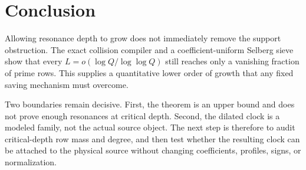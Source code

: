 \section{Conclusion}

Allowing resonance depth to grow does not immediately remove the support
obstruction.  The exact collision compiler and a coefficient-uniform Selberg
sieve show that every
\(L=o(\log Q/\log\log Q)\) still reaches only a vanishing fraction of prime
rows.  This supplies a quantitative lower order of growth that any fixed
saving mechanism must overcome.

Two boundaries remain decisive.  First, the theorem is an upper bound and
does not prove enough resonances at critical depth.  Second, the dilated clock
is a modeled family, not the actual source object.  The next step is therefore
to audit critical-depth row mass and degree, and then test whether the
resulting clock can be attached to the physical source without changing
coefficients, profiles, signs, or normalization.
